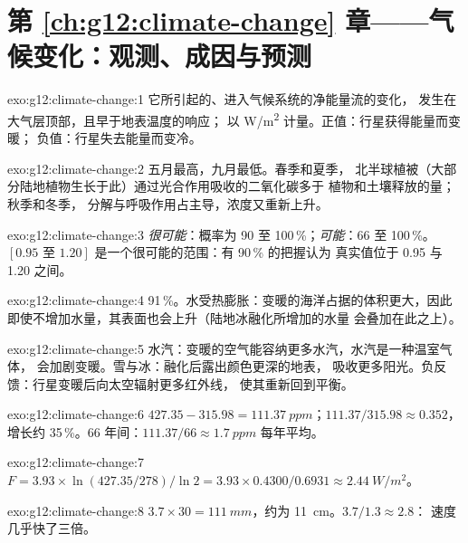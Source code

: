 \section*{第 \ref{ch:g12:climate-change} 章——气候变化：观测、成因与预测}

\begin{solution}{exo:g12:climate-change:1}
它所引起的、进入气候系统的净能量流的变化，
发生在大气层顶部，且早于地表温度的响应；
以 \unit{W/m^2} 计量。正值：行星获得能量而变暖；
负值：行星失去能量而变冷。
\end{solution}

\begin{solution}{exo:g12:climate-change:2}
五月最高，九月最低。春季和夏季，
北半球植被（大部分陆地植物生长于此）通过光合作用吸收的二氧化碳多于
植物和土壤释放的量；秋季和冬季，
分解与呼吸作用占主导，浓度又重新上升。
\end{solution}

\begin{solution}{exo:g12:climate-change:3}
\emph{很可能}：概率为 90 至 100\,\%；\emph{可能}：66 至
100\,\%。$[0.95 \text{ 至 } 1.20]$ 是一个很可能的范围：有 90\,\% 的把握认为
真实值位于 0.95 与 1.20 之间。
\end{solution}

\begin{solution}{exo:g12:climate-change:4}
91\,\%。水受热膨胀：变暖的海洋占据的体积更大，因此
即使不增加水量，其表面也会上升（陆地冰融化所增加的水量
会叠加在此之上）。
\end{solution}

\begin{solution}{exo:g12:climate-change:5}
水汽：变暖的空气能容纳更多水汽，水汽是一种温室气体，
会加剧变暖。雪与冰：融化后露出颜色更深的地表，
吸收更多阳光。负反馈：行星变暖后向太空辐射更多红外线，
使其重新回到平衡。
\end{solution}

\begin{solution}{exo:g12:climate-change:6}
$427.35 - 315.98 = \qty{111.37}{ppm}$；$111.37/315.98 \approx 0.352$，
增长约 35\,\%。66 年间：$111.37/66 \approx
\qty{1.7}{ppm}$ 每年平均。
\end{solution}

\begin{solution}{exo:g12:climate-change:7}
$F = 3.93 \times \ln(427.35/278)/\ln 2 = 3.93 \times 0.4300/0.6931 \approx
\qty{2.44}{W/m^2}$。
\end{solution}

\begin{solution}{exo:g12:climate-change:8}
$3.7 \times 30 = \qty{111}{mm}$，约为 \qty{11}{cm}。$3.7/1.3 \approx 2.8$：
速度几乎快了三倍。
\end{solution}

